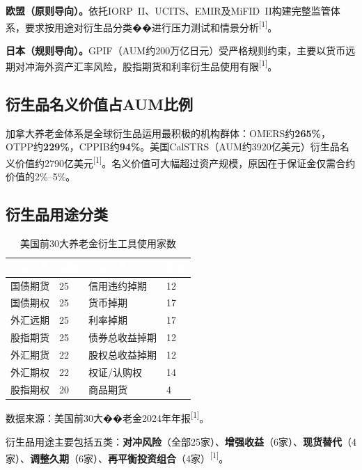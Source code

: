\documentclass[10pt,a4paper,twocolumn]{ctexart}
\begin{document}
\textbf{欧盟（原则导向）。}依托IORP~II、UCITS、EMIR及MiFID~II构建完整监管体系，要求按用途对衍生品分类��进行压力测试和情景分析\textsuperscript{[1]}。

\textbf{日本（规则导向）。}GPIF（AUM约200万亿日元）受严格规则约束，主要以货币远期对冲海外资产汇率风险，股指期货和利率衍生品使用有限\textsuperscript{[1]}。

\subsection{衍生品名义价值占AUM比例}

加拿大养老金体系是全球衍生品运用最积极的机构群体：OMERS约\textbf{265\%}，OTPP约\textbf{229\%}，CPPIB约\textbf{94\%}。美国CalSTRS（AUM约3920亿美元）衍生品名义价值约2790亿美元\textsuperscript{[1]}。名义价值可大幅超过资产规模，原因在于保证金仅需合约价值的2\%--5\%。

\subsection{衍生品用途分类}

\begin{table}[H]
\centering\scriptsize
\caption{美国前30大养老金衍生工具使用家数}
\label{tab:tools}
\renewcommand{\arraystretch}{1.25}
\setlength{\tabcolsep}{4pt}
\begin{tabularx}{\columnwidth}{@{}XC{0.7cm}XC{0.7cm}@{}}
\toprule
{}
\textcolor{white}{\textbf{衍生工具}} &
\textcolor{white}{\textbf{家数}} &
\textcolor{white}{\textbf{衍生工具}} &
\textcolor{white}{\textbf{家数}} \\
\midrule
国债期货 & 25 & 信用违约掉期 & 12 \\
国债期权 & 25 & 货币掉期 & 17 \\
外汇远期 & 25 & 利率掉期 & 17 \\
股指期货 & 25 & 债券总收益掉期 & 12 \\
外汇期货 & 22 & 股权总收益掉期 & 12 \\
外汇期权 & 22 & 权证/认购权 & 14 \\
股指期权 & 20 & 商品期货 & 4 \\
\bottomrule
\end{tabularx}
\end{table}

{\scriptsize 数据来源：美国前30大��老金2024年年报\textsuperscript{[1]}。}

衍生品用途主要包括五类：\textbf{对冲风险}（全部25家）、\textbf{增强收益}（6家）、\textbf{现货替代}（4家）、\textbf{调整久期}（6家）、\textbf{再平衡投资组合}（4家）\textsuperscript{[1]}。
\end{document}
